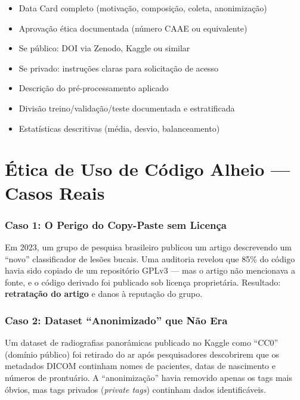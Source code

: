 \begin{itemize}
  \item[\checkmark] Data Card completo (motivação, composição, coleta, anonimização)
  \item[\checkmark] Aprovação ética documentada (número CAAE ou equivalente)
  \item[\checkmark] Se público: DOI via Zenodo, Kaggle ou similar
  \item[\checkmark] Se privado: instruções claras para solicitação de acesso
  \item[\checkmark] Descrição do pré-processamento aplicado
  \item[\checkmark] Divisão treino/validação/teste documentada e estratificada
  \item[\checkmark] Estatísticas descritivas (média, desvio, balanceamento)
\end{itemize}

\section{Ética de Uso de Código Alheio — Casos Reais}

\subsubsection{Caso 1: O Perigo do Copy-Paste sem Licença}

Em 2023, um grupo de pesquisa brasileiro publicou um artigo descrevendo
um ``novo'' classificador de lesões bucais. Uma auditoria revelou que
85\% do código havia sido copiado de um repositório GPLv3 — mas o artigo
não mencionava a fonte, e o código derivado foi publicado sob licença
proprietária. Resultado: \textbf{retratação do artigo} e danos à
reputação do grupo.

\subsubsection{Caso 2: Dataset ``Anonimizado'' que Não Era}

Um dataset de radiografias panorâmicas publicado no Kaggle como ``CC0''
(domínio público) foi retirado do ar após pesquisadores descobrirem que
os metadados DICOM continham nomes de pacientes, datas de nascimento e
números de prontuário. A ``anonimização'' havia removido apenas os tags
mais óbvios, mas tags privados (\textit{private tags}) continham dados
identificáveis.


